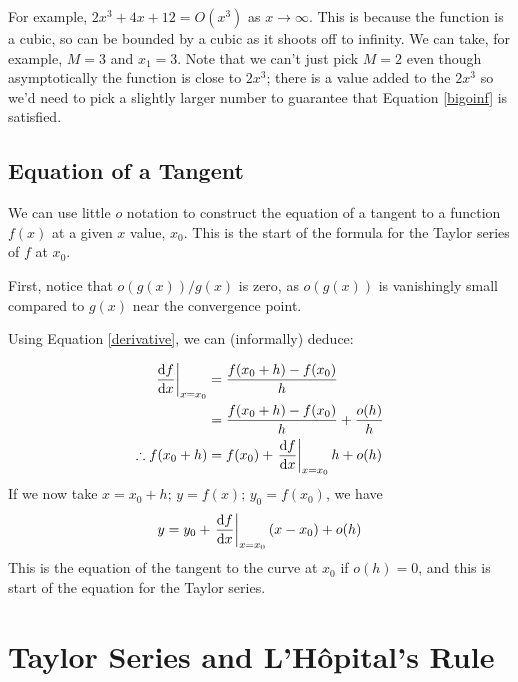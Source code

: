 \documentclass{article}
\begin{document}
For example, $2x^3 + 4x + 12 = O(x^3)$ as $x \to \infty$. This is because the function is a cubic, so can be bounded by a cubic as it shoots off to infinity. We can take, for example, $M = 3$ and $x_1 = 3$. Note that we can't just pick $M=2$ even though asymptotically the function is close to $2x^3$; there is a value added to the $2x^3$ so we'd need to pick a slightly larger number to guarantee that Equation \eqref{bigoinf} is satisfied.

\subsection{Equation of a Tangent}
We can use little $o$ notation to construct the equation of a tangent to a function $f(x)$ at a given $x$ value, $x_0$. This is the start of the formula for the Taylor series of $f$ at $x_0$.

First, notice that $o(g(x))/g(x)$ is zero, as $o(g(x))$ is vanishingly small compared to $g(x)$ near the convergence point.

Using Equation \eqref{derivative}, we can (informally) deduce:

\begin{align*}
	\eval{\frac{\dd f}{\dd x}}_{x=x_0} & = \frac{f(x_0 + h) - f(x_0)}{h}                        \\
	                                   & = \frac{f(x_0 + h) - f(x_0)}{h} + \frac{o(h)}{h}       \\
	\therefore f(x_0 + h)              & = f(x_0) + \eval{\frac{\dd f}{\dd x}}_{x=x_0} h + o(h)
\end{align*}
If we now take $x=x_0+h;\,y=f(x);\,y_0=f(x_0)$, we have
\[ y = y_0 + \eval{\frac{\dd f}{\dd x}}_{x=x_0}(x - x_0) + o(h) \]
This is the equation of the tangent to the curve at $x_0$ if $o(h)=0$, and this is start of the equation for the Taylor series.

\section{Taylor Series and L'H\^opital's Rule}
\end{document}
